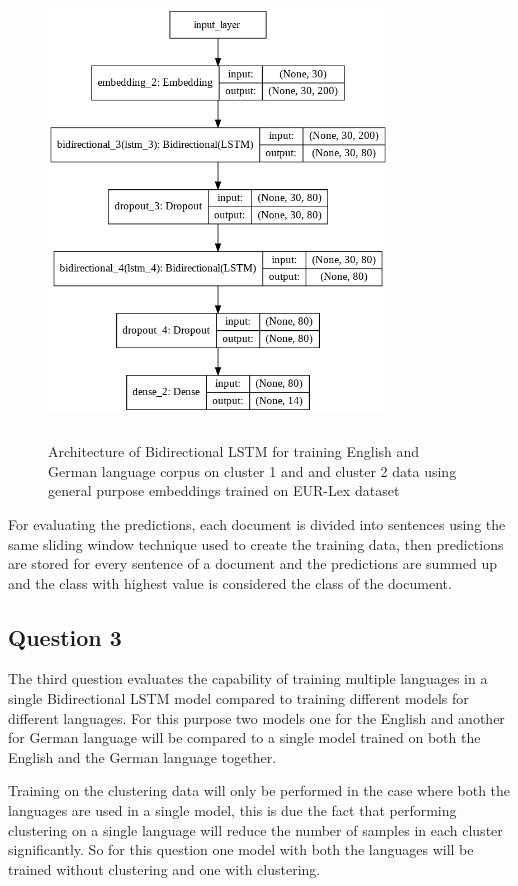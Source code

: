 \begin{figure}[!ht]
    \centering
    \includegraphics[width=9cm, height=12cm]{pics/LSTM_LEGALEMB_CLUSTER_1.png}
    \captionsetup{justification=centering,margin=2cm}
    \caption{Architecture of Bidirectional LSTM for training English and German language corpus on cluster 1 and and cluster 2 data using general purpose embeddings trained on EUR-Lex dataset}
    \label{fig:LegalEmbCluster}
\end{figure}

For evaluating the predictions, each document is divided into sentences using the same sliding window technique used to create the training data, then predictions are stored for every sentence of a document and the predictions are summed up and the class with highest value is considered the class of the document. 

\subsection{Question 3}
The third question evaluates the capability of training multiple languages in a single Bidirectional LSTM model compared to training different models for different languages. For this purpose two models one for the English and another for German language will be compared to a single model trained on both the English and the German language together.

Training on the clustering data will only be performed in the case where both the languages are used in a single model, this is due the fact that performing clustering on a single language will reduce the number of samples in each cluster significantly. So for this question one model with both the languages will be trained without clustering and one with clustering. 

